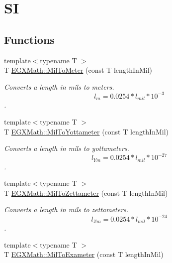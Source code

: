\hypertarget{group___e_g_x_math-_conversions-_length_conversions-_imperial-_mil-_s_i}{}\section{SI}
\label{group___e_g_x_math-_conversions-_length_conversions-_imperial-_mil-_s_i}
\subsection*{Functions}
\begin{DoxyCompactItemize}
\item 
{\footnotesize template$<$typename T $>$ }\\T \mbox{\hyperlink{group___e_g_x_math-_conversions-_length_conversions-_imperial-_mil-_s_i_ga1ee4f51e99ac754f1849f933a661b07c}{E\+G\+X\+Math\+::\+Mil\+To\+Meter}} (const T length\+In\+Mil)
\begin{DoxyCompactList}\small\item\em Converts a length in mils to meters. \[ l_{m}=0.0254 * l_{mil} * 10^{-3} \]. \end{DoxyCompactList}\item 
{\footnotesize template$<$typename T $>$ }\\T \mbox{\hyperlink{group___e_g_x_math-_conversions-_length_conversions-_imperial-_mil-_s_i_gaa7be73e4efb8f962d8d7944cdeb842df}{E\+G\+X\+Math\+::\+Mil\+To\+Yottameter}} (const T length\+In\+Mil)
\begin{DoxyCompactList}\small\item\em Converts a length in mils to yottameters. \[ l_{Ym}=0.0254* l_{mil} * 10^{-27} \]. \end{DoxyCompactList}\item 
{\footnotesize template$<$typename T $>$ }\\T \mbox{\hyperlink{group___e_g_x_math-_conversions-_length_conversions-_imperial-_mil-_s_i_ga431c92390fcf7f25c6c57e9a3124153b}{E\+G\+X\+Math\+::\+Mil\+To\+Zettameter}} (const T length\+In\+Mil)
\begin{DoxyCompactList}\small\item\em Converts a length in mils to zettameters. \[ l_{Zm}=0.0254* l_{mil} * 10^{-24} \]. \end{DoxyCompactList}\item 
{\footnotesize template$<$typename T $>$ }\\T \mbox{\hyperlink{group___e_g_x_math-_conversions-_length_conversions-_imperial-_mil-_s_i_gae24a05aa769e66474c602e6087fd7351}{E\+G\+X\+Math\+::\+Mil\+To\+Exameter}} (const T length\+In\+Mil)

\end{DoxyCompactItemize}

